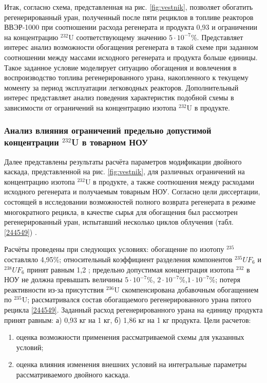 Итак, согласно \cite{smirnovObogashchenieRegenerirovannogoUrana2018} схема, представленная на рис. \ref{fig:vestnik}, позволяет обогатить регенерированный уран, полученный после пяти рециклов в топливе реакторов ВВЭР-1000 при соотношении расхода регенерата и продукта 0,93 и ограничении на концентрацию $^{232}$U соответствующему значению $5\cdot10^{-7}$\%. Представляет интерес анализ возможности обогащения регенерата в такой схеме при заданном соотношении между массами исходного регенерата и продукта больше единицы. Такое заданное условие моделирует ситуацию обогащения и вовлечения в воспроизводство топлива регенерированного урана, накопленного к текущему моменту за период эксплуатации легководных реакторов. Дополнительный интерес представляет анализ поведения характеристик подобной схемы в зависимости от ограничений на концентрацию изотопа $^{232}$U в продукте. 

\subsubsection{Анализ влияния ограничений предельно допустимой концентрации $^{232}$U в товарном НОУ}

Далее представлены результаты расчёта параметров модификации двойного каскада, представленной на рис. \ref{fig:vestnik}, для различных ограничений на концентрацию изотопа $^{232}$U в продукте, а также соотношения между расходами исходного регенерата и получаемым товарным НОУ.
Согласно цели диссертации, состоящей в исследовании возможностей полного возврата регенерата в режиме многократного рецикла, в качестве сырья для обогащения был рассмотрен регенерированный уран, испытавший несколько циклов облучения (табл. \ref{244549}) \cite{palkinDesignanalyticalResearchRefinement2010}.

Расчёты проведены при следующих условиях: обогащение по изотопу $^{235}$ составляло 4,95\%; относительный коэффициент разделения компонентов $^{235}UF_6$ и $^{238}UF_6$ принят равным 1,2 \cite{smirnovObogashchenieRegenerirovannogoUrana2018}; предельно допустимая концентрация изотопа $^{232}$ в НОУ не должна превышать величины $5\cdot10^{-7}$\%, $2\cdot10^{-7}$\%,$1\cdot10^{-7}$\%; потеря реактивности из-за присутствия $^{236}$U скомпенсирована добавочным обогащением по $^{235}$U; рассматривался состав обогащаемого регенерированного урана пятого рецикла \ref{244549}. Заданный расход регенерированного урана на единицу продукта принят равным:
а) 0,93 кг на 1 кг,
б) 1,86 кг на 1 кг продукта.
Цели расчетов:
\begin{enumerate}
  \item оценка возможности применения рассматриваемой схемы для указанных условий;
  \item оценка влияния изменения внешних условий на интегральные параметры рассматриваемого двойного каскада.
\end{enumerate}

